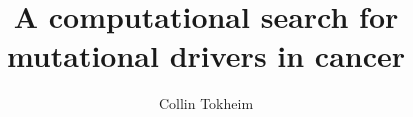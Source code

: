 \documentclass[12pt,oneside,final]{thesis}
\theoremstyle{definition}
\theoremstyle{remark}
\theoremstyle{remark}
\begin{document}
\title{A computational search for mutational drivers in cancer}
\author{Collin Tokheim}
\dissertation
\doctorphilosophy
\copyrightnotice












\appendix







\end{document}
